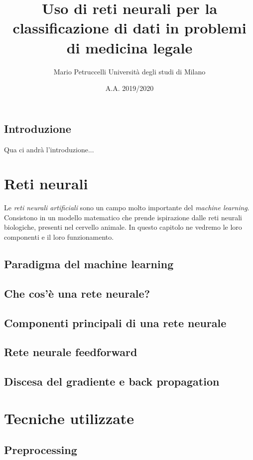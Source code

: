 \documentclass[12pt, twoside, letterpaper]{report}
\title{Uso di reti neurali per la classificazione di dati in problemi di medicina legale}
\author{Mario Petruccelli \cr Università degli studi di Milano}
\date{A.A. 2019/2020}
\begin{document}
	\begin{titlepage}
		\newpage
		\tableofcontents
	\end{titlepage}

	\section*{Introduzione} 
		Qua ci andrà l'introduzione...

		\newpage		
	\chapter{Reti neurali}
		Le \textit{reti neurali artificiali} sono un campo molto importante del \textit{machine learning}. Consistono in un modello matematico che prende ispirazione dalle reti neurali biologiche, presenti nel cervello animale. In questo capitolo ne vedremo le loro componenti e il loro funzionamento.

		\section{Paradigma del machine learning}
			
		\section{Che cos'è una rete neurale?}
		\section{Componenti principali di una rete neurale}
		\section{Rete neurale feedforward}
		\section{Discesa del gradiente e back propagation}
		
	\chapter{Tecniche utilizzate}
		\section{Preprocessing}
\end{document}
